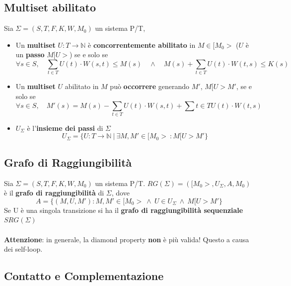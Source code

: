 \subsection{Multiset abilitato}
Sia $\Sigma = (S, T, F, K, W, M_0)$ un sistema P/T,
\begin{itemize}
	\item Un \textbf{multiset} $U : T \to \mathbb N$ è \textbf{concorrentemente abilitato} in $M \in [M_0>$ ($U$ è un \textbf{passo} $M[U>$) se e solo se
	      \[
		      \forall s \in S,
		      \quad
		      \sum_{t \in T}{U(t) \cdot W(s, t)} \leq M(s)
		      \quad \wedge \quad
		      M(s) + \sum_{t \in T}{U(t) \cdot W(t, s) \leq K(s)}
	      \]
	\item Un \textbf{multiset} $U$ abilitato in $M$ può \textbf{occorrere} generando $M'$, $M[U>M'$, se e solo se
	      \[
		      \forall s \in S,
		      \quad
		      M'(s)
		      =
		      M(s)
		      -
		      \sum_{t \in T}{U(t) \cdot W(s, t)}
		      +
		      \sum{t \in T}{U(t) \cdot W(t, s)}
	      \]
	\item $U_\Sigma$ è l'\textbf{insieme dei passi} di $\Sigma$
	      \[
		      U_\Sigma
		      =
		      \{
		      U : T \to \mathbb N \ | \ \exists M, M' \in [M_0> \ : M[U > M'
		      \}
	      \]
\end{itemize}

\subsection{Grafo di Raggiungibilità}
Sia $\Sigma = (S, T, F, K, W, M_0)$ un sistema P/T. $RG(\Sigma) = ([M_0>, U_\Sigma, A, M_0)$ è il \textbf{grafo di raggiungibilità} di $\Sigma$, dove
\[
	A
	=
	\{
	(M, U, M') : M, M' \in [M_0> \ \wedge \ U \in U_\Sigma \ \wedge \ M[U>M'
	\}
\]
Se U è una singola transizione si ha il \textbf{grafo di raggiungibilità sequenziale} $SRG(\Sigma)$
\\
\\
\textbf{Attenzione}: in generale, la diamond property \textbf{non} è più valida! Questo a causa dei self-loop.

\subsection{Contatto e Complementazione}

